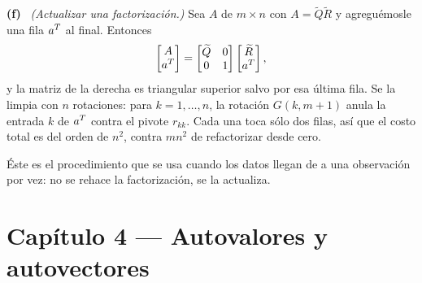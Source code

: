 \documentclass[11pt,a4paper]{article}
\newcounter{entrega}[section]
\newcommand{\itemsol}[1]{\par\medskip\noindent\textbf{(#1)}\ \ignorespaces}
\begin{document}
\itemsol{f} \emph{(Actualizar una factorización.)} Sea $A$ de $m\times n$ con
$A=\widetilde Q\widetilde R$ y agreguémosle una fila $a^T$ al final. Entonces
\[
\begin{bmatrix}A\\ a^T\end{bmatrix}
=\begin{bmatrix}\widetilde Q&0\\ 0&1\end{bmatrix}
 \begin{bmatrix}\widetilde R\\ a^T\end{bmatrix},
\]
y la matriz de la derecha es triangular superior salvo por esa última fila. Se
la limpia con $n$ rotaciones: para $k=1,\dots,n$, la rotación $G(k,m+1)$ anula
la entrada $k$ de $a^T$ contra el pivote $r_{kk}$. Cada una toca sólo dos
filas, así que el costo total es del orden de $n^2$, contra $mn^2$ de
refactorizar desde cero.

Éste es el procedimiento que se usa cuando los datos llegan de a una observación
por vez: no se rehace la factorización, se la actualiza.


\clearpage
\section{Capítulo 4 --- Autovalores y autovectores}
\setcounter{entrega}{0}
\end{document}
